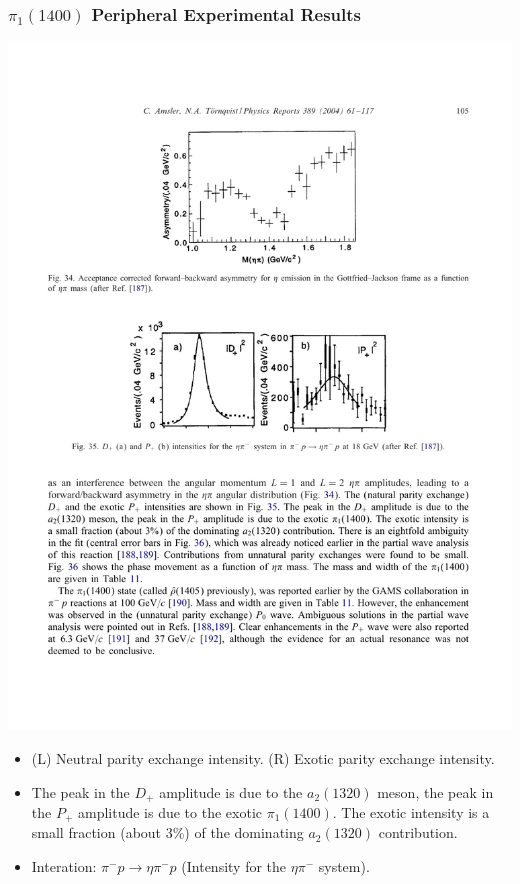\documentclass[mathserif,18pt,xcolor=table]{beamer}
\begin{document}
\begin{frame}
  \frametitle{$\pi_1(1400)$ Peripheral Experimental Results}
  \begin{center}
    \includegraphics[width=.75\linewidth]{../figures/ping35.pdf}
  \end{center}
  \small{
    \begin{itemize}
    \item (L) Neutral parity exchange intensity. (R) Exotic parity exchange intensity.
    \item The peak in the $D_+$ amplitude is due to the $a_2(1320)$ meson, the peak in the $P_+$ amplitude is due to the exotic $\pi_1(1400)$. The exotic intensity is a small fraction (about 3\%) of the dominating $a_2(1320)$ contribution.
    \item Interation: $\pi^- p \rightarrow \eta\pi^-p$ (Intensity for the $\eta\pi^-$ system).
  \end{itemize}}
\end{frame}
\end{document}
